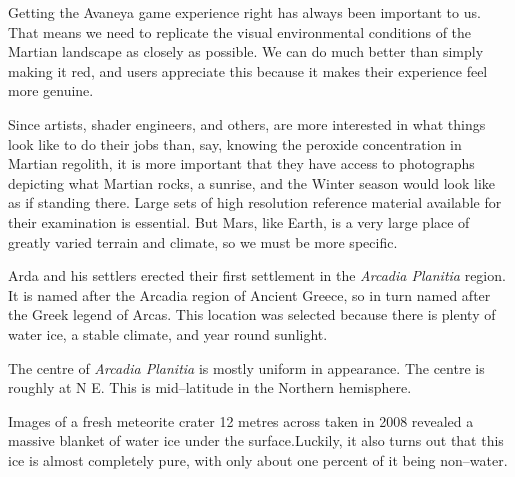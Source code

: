 



    {}
Getting the Avaneya game experience right has always been important to us. That means we need to replicate the visual environmental conditions of the Martian landscape as closely as possible. We can do much better than simply making it red, and users appreciate this because it makes their experience feel more genuine.

Since artists, shader engineers, and others, are more interested in what things look like to do their jobs than, say, knowing the peroxide concentration in Martian regolith, it is more important that they have access to photographs depicting what Martian rocks, a sunrise, and the Winter season would look like as if standing there. Large sets of high resolution reference material available for their examination is essential. But Mars, like Earth, is a very large place of greatly varied terrain and climate, so we must be more specific.

Arda and his settlers erected their first settlement in the {\it Arcadia Planitia} region. It is named after the Arcadia region of Ancient Greece, so in turn named after the Greek legend of Arcas. This location was selected because there is plenty of water ice, a stable climate, and year round sunlight.

The centre of {\it Arcadia Planitia} is mostly uniform in appearance. The centre is roughly at N E. This is mid--latitude in the Northern hemisphere. 

Images of a fresh meteorite crater 12 metres across taken in 2008 revealed a massive blanket of water ice under the surface. Luckily, it also turns out that this ice is almost completely pure, with only about one percent of it being non--water.

